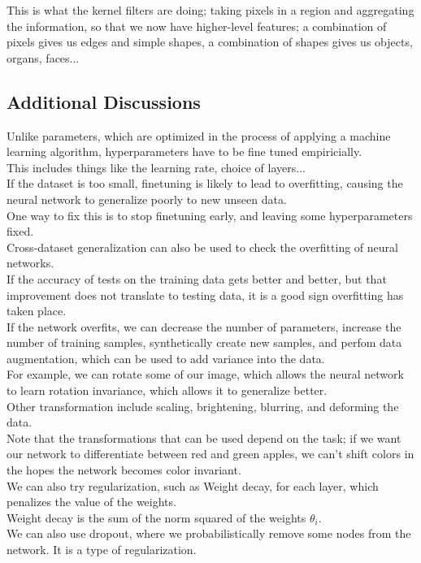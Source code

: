 \documentclass[12pt]{article}
\begin{document}
This is what the kernel filters are doing;
taking pixels in a region and aggregating the
information, so that we now have higher-level
features;
a combination of pixels gives us edges and
simple shapes, a combination of shapes gives
us objects, organs, faces... \\

\newpage

\subsection*{Additional Discussions}

Unlike parameters, which are optimized in the
process of applying a machine learning algorithm,
hyperparameters have to be fine tuned
empiricially. \\
This includes things like the learning rate,
choice of layers... \\

If the dataset is too small, finetuning
is likely to lead to overfitting,
causing the neural network to generalize
poorly to new unseen data. \\
One way to fix this is to stop finetuning early,
and leaving some hyperparameters fixed. \\

Cross-dataset generalization can also be used
to check the overfitting of neural networks. \\
If the accuracy of tests on the training data
gets better and better, but that improvement does
not translate to testing data, it is a good sign
overfitting has taken place. \\

If the network overfits, we can decrease the number
of parameters, increase the number of training samples,
synthetically create new samples, and perfom 
data augmentation, which can be used to add variance
into the data. \\
For example, we can rotate some of our image,
which allows the neural network to learn rotation
invariance, which allows it to generalize better. \\
Other transformation include scaling, brightening,
blurring, and deforming the data. \\

Note that the transformations that can be used
depend on the task; if we want our network to
differentiate between red and green apples,
we can't shift colors in the hopes the network
becomes color invariant. \\

We can also try regularization,
such as Weight decay, for each layer, which
penalizes the value of the weights. \\
Weight decay is the sum of the norm squared
of the weights $\theta_i$. \\

We can also use dropout, where we probabilistically
remove some nodes from the network. 
It is a type of regularization. \\
\end{document}
